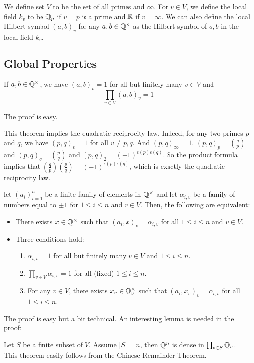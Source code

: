 \documentclass[15pt]{scrartcl}
\newcommand{\legendre}[2]{\left(\frac{#1}{#2}\right)}
\begin{document}
\begin{definition}
    We define set $V$ to be the set of all primes and $\infty$. For $v\in V$, we define the local field $k_v$ to be $\mathbb Q_p$ if $v=p$ is a prime and $\mathbb R$ if $v=\infty$. We can also define the local Hilbert symbol $(a,b)_v$ for any $a,b\in \mathbb Q^\times$ as the Hilbert symbol of $a,b$ in the local field $k_v$.
\end{definition}
\subsection{Global Properties}
\begin{theorem}
    If $a,b\in \mathbb Q^\times$, we have $(a,b)_v=1$ for all but finitely many $v\in V$ and \[\prod_{v\in V} (a,b)_v=1\]
\end{theorem}
The proof is easy. 
\begin{remark}
    This theorem implies the quadratic reciprocity law.
    Indeed, for any two primes $p$ and $q$, we have $(p,q)_v=1$ for all $v\neq p,q$. And $(p,q)_\infty=1$. $(p,q)_p=\legendre{q}{p}$ and $(p,q)_q=\legendre{p}{q}$ and $(p,q)_2=(-1)^{\epsilon(p)\epsilon(q)}$. So the product formula implies that $\legendre{q}{p}\legendre{p}{q}=(-1)^{\epsilon(p)\epsilon(q)}$, which is exactly the quadratic reciprocity law.
\end{remark}
\begin{theorem}
    let $(a_i)_{i=1}^n$ be a finite family of elements in $\mathbb Q^\times$ and let $\alpha_{i,v}$ be a family of numbers equal to $\pm 1$ for $1\leq i \leq n$ and $v\in V$. Then, the following are equivalent:
\begin{itemize}
    \item There exists $x\in \mathbb Q^\times$ such that $(a_i, x)_v=\alpha_{i,v}$ for all $1\leq i \leq n$ and $v\in V$.
    \item Three conditions hold:
    \begin{enumerate}
        \item $\alpha_{i,v}=1$ for all but finitely many $v\in V$ and $1\leq i \leq n$.
        \item $\prod_{v\in V} \alpha_{i,v}=1$ for all  (fixed) $1\leq i \leq n$.
        \item For any $v\in V$, there exists $x_v\in \mathbb Q_v^\times$ such that $(a_i,x_v)_v=\alpha_{i,v}$ for all $1\leq i \leq n$.
    \end{enumerate}
\end{itemize}
\end{theorem}
The proof is easy but a bit technical. An interesting lemma is needed in the proof:
\begin{lemma}
    Let $S$ be a finite subset of $V$. Assume $|S|=n$, then $\mathbb Q^n$ is dense in $\prod_{v\in S} \mathbb Q_v$.
    \\

    This theorem easily follows from the Chinese Remainder Theorem.
\end{lemma}
\newpage
\end{document}
